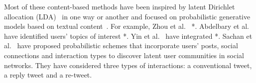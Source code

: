 \documentclass[sigconf]{acmart}
\begin{document}
Most of these content-based methods have been inspired by latent Dirichlet allocation (LDA)~\cite{DBLP:journals/jmlr/BleiNJ03} in one way or another and focused on probabilistic generative models based on textual content~\cite{DBLP:conf/www/ZhouMLGZ06, DBLP:conf/www/SachanCFS12}. For example, Zhou et al.~\cite{DBLP:conf/www/ZhouMLGZ06} *. Abdelbary et al.~\cite{Abdelbary6918274} have identified users' topics of interest *. Yin et al.~\cite{DBLP:journals/tist/YinCGH12} have integrated *. Sachan et al.~\cite{DBLP:conf/www/SachanCFS12} have proposed probabilistic schemes that incorporate users' posts, social connections and interaction types to discover latent user communities in social networks. They have considered three types of interactions: a conventional tweet, a reply tweet and a re-tweet.
\begin{table}[t!]
\centering
\caption{Summary of our review on *. Black vs. {\color{gray} gray} show strong vs. conservative positive (\pmb{\checkmark}) or negative () answers.}
\label{tab:rqsum}
\vspace{-1em}
\vspace{-1.5em}
\end{table}
\end{document}
